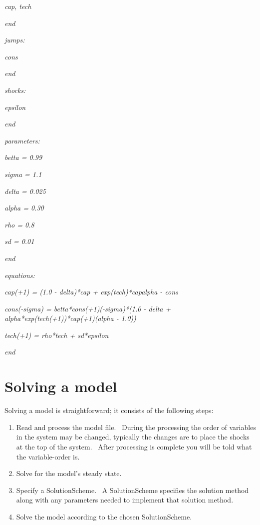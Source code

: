 \documentclass[notitlepage,11pt]{article}
\begin{document}
\textit{cap, tech}

\textit{end}

\textit{\bigskip }

\textit{jumps:}

\textit{cons}

\textit{end}

\textit{\bigskip }

\textit{shocks:}

\textit{epsilon}

\textit{end}

\textit{\bigskip }

\textit{parameters:}

\textit{betta = 0.99}

\textit{sigma = 1.1}

\textit{delta = 0.025}

\textit{alpha = 0.30}

\textit{rho = 0.8}

\textit{sd = 0.01}

\textit{end}

\textit{\bigskip }

\textit{equations:}

\textit{cap(+1) = (1.0 - delta)*cap + exp(tech)*capalpha - cons}

\textit{cons(-sigma) = betta*cons(+1)(-sigma)*(1.0 -
delta + alpha*exp(tech(+1))*cap(+1)(alpha - 1.0))}

\textit{tech(+1) = rho*tech + sd*epsilon}

\textit{end}

\section{Solving a model}

Solving a model is straightforward; it consists of the following steps:

\begin{enumerate}
\item Read and process the model file. \ During the processing the order of
variables in the system may be changed, typically the changes are to place
the shocks at the top of the system. \ After processing is complete you will
be told what the variable-order is.

\item Solve for the model's steady state.

\item Specify a SolutionScheme. \ A SolutionScheme specifies the solution
method along with any parameters needed to implement that solution method.

\item Solve the model according to the chosen SolutionScheme.
\end{enumerate}
\end{document}
